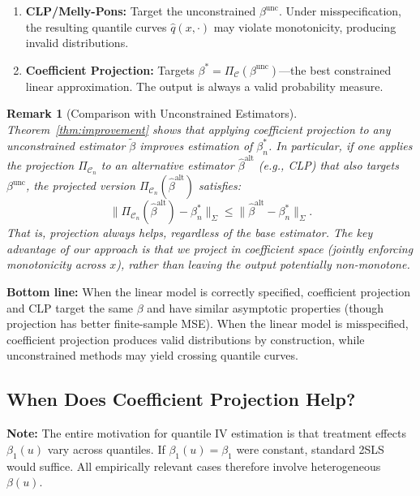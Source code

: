 \documentclass[12pt]{article}
\newtheorem{remark}{Remark}
\begin{document}
\begin{enumerate}
    \item \textbf{CLP/Melly-Pons:} Target the unconstrained $\beta^{\text{unc}}$. Under misspecification, the resulting quantile curves $\hat{q}(x, \cdot)$ may violate monotonicity, producing invalid distributions.
    
    \item \textbf{Coefficient Projection:} Targets $\beta^* = \Pi_{\mathcal{C}}(\beta^{\text{unc}})$---the best constrained linear approximation. The output is always a valid probability measure.
\end{enumerate}

\begin{remark}[Comparison with Unconstrained Estimators]\label{rem:dominance}
Theorem~\ref{thm:improvement} shows that applying coefficient projection to \emph{any} unconstrained estimator $\tilde{\beta}$ improves estimation of $\beta^*_n$. In particular, if one applies the projection $\Pi_{\mathcal{C}_n}$ to an alternative estimator $\hat{\beta}^{\text{alt}}$ (e.g., CLP) that also targets $\beta^{\text{unc}}$, the projected version $\Pi_{\mathcal{C}_n}(\hat{\beta}^{\text{alt}})$ satisfies:
\[
\|\Pi_{\mathcal{C}_n}(\hat{\beta}^{\text{alt}}) - \beta^*_n\|_{\Sigma} \leq \|\hat{\beta}^{\text{alt}} - \beta^*_n\|_{\Sigma}.
\]
That is, projection always helps, regardless of the base estimator. The key advantage of our approach is that we project in coefficient space (jointly enforcing monotonicity across $x$), rather than leaving the output potentially non-monotone.
\end{remark}

\textbf{Bottom line:} When the linear model is correctly specified, coefficient projection and CLP target the same $\beta$ and have similar asymptotic properties (though projection has better finite-sample MSE). When the linear model is misspecified, coefficient projection produces valid distributions by construction, while unconstrained methods may yield crossing quantile curves.

\subsection{When Does Coefficient Projection Help?}

\textbf{Note:} The entire motivation for quantile IV estimation is that treatment effects $\beta_1(u)$ vary across quantiles. If $\beta_1(u) = \beta_1$ were constant, standard 2SLS would suffice. All empirically relevant cases therefore involve heterogeneous $\beta(u)$.
\end{document}
